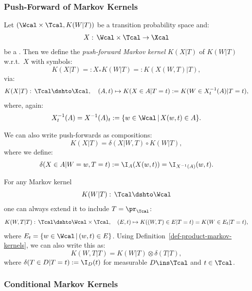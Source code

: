 \subsubsection{Push-Forward of Markov Kernels}



\begin{Def}
    Let $ (\Wcal \times \Tcal,K(W|T))$ be a transition probability space and:
    \[ X:\, \Wcal \times \Tcal \to \Xcal  \]
    be a \trv{}.
    Then we define the \emph{push-forward Markov kernel} $K(X|T)$ of $K(W|T)$ w.r.t.\ $X$ with symbols:
    \[K(X|T) =: X_*K(W|T) =: K(X(W,T)|T),\]
    via:
    \[ K(X|T):\, \Tcal \dshto \Xcal,\quad (A,t) \mapsto K(X \in A|T=t) := K(W \in X^{-1}_t(A)|T=t), \]
    where, again:
    \[ X^{-1}_t(A) = X^{-1}(A)_t:= \{ w\in \Wcal\,|\,X(w,t) \in A \}.\]
\end{Def}

\begin{Rem}
    We can also write push-forwards as compositions:
    \[K(X|T) = \delta(X|W,T) \circ K(W|T),\]
    where we define:
    \[\delta(X \in A|W=w,T=t) := \I_A(X(w,t)) = \I_{X^{-1}(A)}(w,t).\]
\end{Rem}

\begin{Rem}\label{rem:extending_markov_kernel}
    For any Markov kernel
    \[ K(W|T):\, \Tcal \dshto \Wcal\]
    one can always extend it to include $T=\pr_\Tcal$:
    \[ K(W,T|T):\, \Tcal \dshto \Wcal \times \Tcal,\quad (E,t) \mapsto 
    K( (W,T)  \in E| T=t) = K( W \in E_t|T=t), \]
    where $E_t = \{ w \in \Wcal\,|\,(w,t) \in E\}$.
    Using Definition~\ref{def-product-markov-kernels}, we can also write this as:
    \[ K(W,T|T) = K(W|T) \otimes \delta(T|T),\]
    where $\delta(T \in D|T=t) := \I_D(t)$ for measurable $D \ins \Tcal$ and $t \in \Tcal$.
\end{Rem}


\subsubsection{Conditional Markov Kernels}

